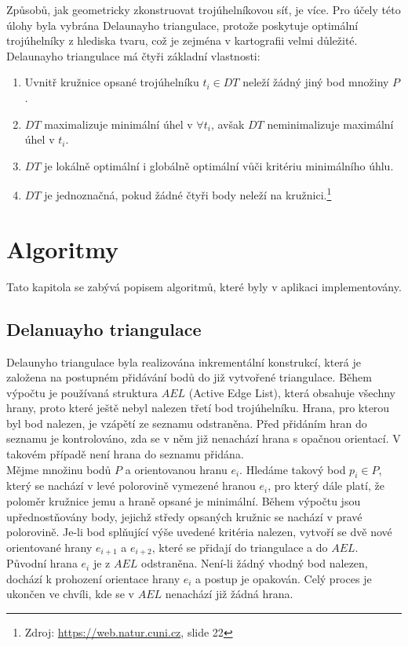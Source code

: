 \documentclass[a4paper, 12pt]{article}
\begin{document}
Způsobů, jak geometricky zkonstruovat trojúhelníkovou síť, je více. Pro účely této úlohy byla vybrána Delaunayho triangulace, protože poskytuje optimální trojúhelníky z hlediska tvaru, což je zejména v kartografii velmi důležité. Delaunayho triangulace má čtyři základní vlastnosti:
\begin{enumerate}
\item Uvnitř kružnice opsané trojúhelníku $t_i \in DT$ neleží žádný jiný bod množiny $P$.
\item $DT$ maximalizuje minimální úhel v $\forall t_i$, avšak $DT$ neminimalizuje maximální úhel v $t_i$.
\item $DT$ je lokálně optimální i globálně optimální vůči kritériu minimálního úhlu.
\item $DT$ je jednoznačná, pokud žádné čtyři body neleží na kružnici.\footnote{Zdroj: \href{https://web.natur.cuni.cz/~bayertom/images/courses/Adk/adk5.pdf}{https://web.natur.cuni.cz}, slide 22}
\end{enumerate}

\section{Algoritmy}
Tato kapitola se zabývá popisem algoritmů, které byly v aplikaci implementovány. 

\subsection{Delanuayho triangulace}
Delaunyho triangulace byla realizována inkrementální konstrukcí, která je založena na postupném přidávání bodů do již vytvořené triangulace. Během výpočtu je používaná struktura $AEL$ (Active Edge List), která obsahuje všechny hrany, proto které ještě nebyl nalezen třetí bod trojúhelníku. Hrana, pro kterou byl bod nalezen, je vzápětí ze seznamu odstraněna. Před přidáním hran do seznamu je kontrolováno, zda se v něm již nenachází hrana s opačnou orientací. V takovém případě není hrana do seznamu přidána.\\

Mějme množinu bodů $P$ a orientovanou hranu $e_i$. Hledáme takový bod $p_i \in P$, který se nachází v levé polorovině vymezené hranou $e_i$, pro který dále platí, že poloměr kružnice jemu a hraně opsané je minimální. Během výpočtu jsou upřednostňovány body, jejichž středy opsaných kružnic se nachází v pravé polorovině. Je-li bod splňující výše uvedené kritéria nalezen, vytvoří se dvě nové orientované hrany $e_{i+1}$ a $e_{i+2}$, které se přidají do triangulace a do $AEL$. Původní hrana $e_i$ je z $AEL$ odstraněna. Není-li žádný vhodný bod nalezen, dochází k prohození orientace hrany $e_i$ a postup je opakován. Celý proces je ukončen ve chvíli, kde se v $AEL$ nenachází již žádná hrana. \\ 
\end{document}
